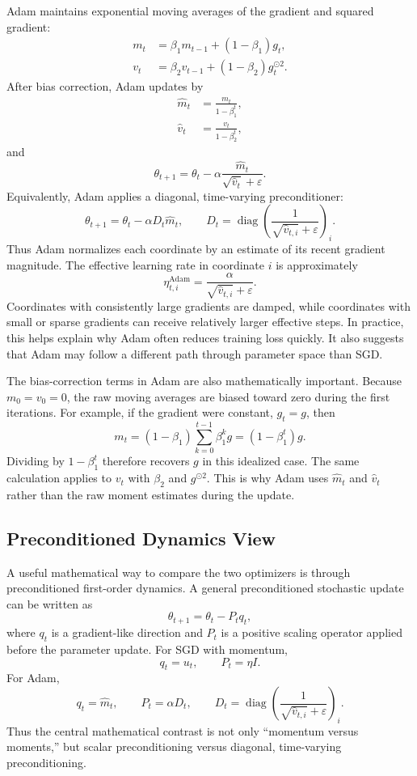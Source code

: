 \documentclass[11pt]{article}
\begin{document}
Adam maintains exponential moving averages of the gradient and squared gradient:
\begin{align}
m_t &= \beta_1 m_{t-1} + (1-\beta_1)g_t,\\
v_t &= \beta_2 v_{t-1} + (1-\beta_2)g_t^{\odot 2}.
\end{align}
After bias correction, Adam updates by
\begin{align}
\hat m_t &= \frac{m_t}{1-\beta_1^t},\\
\hat v_t &= \frac{v_t}{1-\beta_2^t},
\end{align}
and
\[
\theta_{t+1}
= \theta_t - \alpha \frac{\hat m_t}{\sqrt{\hat v_t}+\varepsilon}.
\]
Equivalently, Adam applies a diagonal, time-varying preconditioner:
\[
\theta_{t+1}
= \theta_t - \alpha D_t \hat m_t,
\qquad
D_t = \operatorname{diag}\left(\frac{1}{\sqrt{\hat v_{t,i}}+\varepsilon}\right)_i.
\]
Thus Adam normalizes each coordinate by an estimate of its recent gradient magnitude. The effective learning rate in coordinate $i$ is approximately
\[
\eta_{t,i}^{\mathrm{Adam}}
= \frac{\alpha}{\sqrt{\hat v_{t,i}}+\varepsilon}.
\]
Coordinates with consistently large gradients are damped, while coordinates with small or sparse gradients can receive relatively larger effective steps. In practice, this helps explain why Adam often reduces training loss quickly. It also suggests that Adam may follow a different path through parameter space than SGD.

The bias-correction terms in Adam are also mathematically important. Because $m_0=v_0=0$, the raw moving averages are biased toward zero during the first iterations. For example, if the gradient were constant, $g_t=g$, then
\[
m_t
= (1-\beta_1)\sum_{k=0}^{t-1}\beta_1^k g
= (1-\beta_1^t)g.
\]
Dividing by $1-\beta_1^t$ therefore recovers $g$ in this idealized case. The same calculation applies to $v_t$ with $\beta_2$ and $g^{\odot 2}$. This is why Adam uses $\hat m_t$ and $\hat v_t$ rather than the raw moment estimates during the update.

\subsection{Preconditioned Dynamics View}

A useful mathematical way to compare the two optimizers is through preconditioned first-order dynamics. A general preconditioned stochastic update can be written as
\[
\theta_{t+1}
=
\theta_t - P_t q_t,
\]
where $q_t$ is a gradient-like direction and $P_t$ is a positive scaling operator applied before the parameter update. For SGD with momentum,
\[
q_t=u_t,\qquad P_t=\eta I.
\]
For Adam,
\[
q_t=\hat m_t,\qquad
P_t=\alpha D_t,
\qquad
D_t=\operatorname{diag}\left(\frac{1}{\sqrt{\hat v_{t,i}}+\varepsilon}\right)_i.
\]
Thus the central mathematical contrast is not only ``momentum versus moments,'' but scalar preconditioning versus diagonal, time-varying preconditioning.
\end{document}
